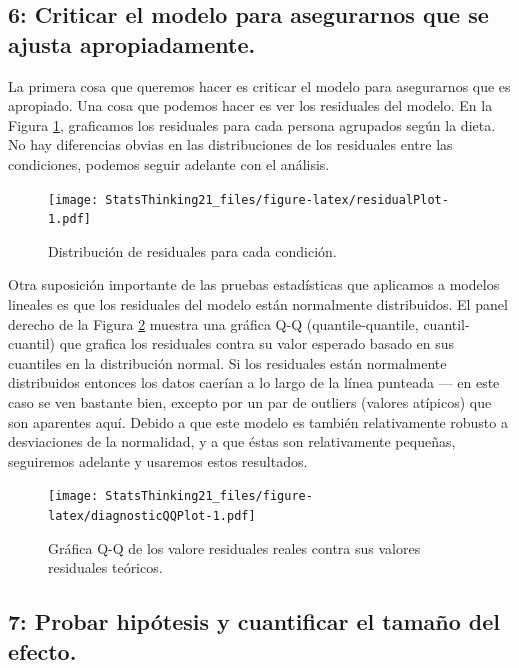 \documentclass[
  12pt,
]{book}
\theoremstyle{definition}
\theoremstyle{definition}
\theoremstyle{definition}
\theoremstyle{remark}
\begin{document}
\hypertarget{criticar-el-modelo-para-asegurarnos-que-se-ajusta-apropiadamente.}{%
\subsection{6: Criticar el modelo para asegurarnos que se ajusta apropiadamente.}\label{criticar-el-modelo-para-asegurarnos-que-se-ajusta-apropiadamente.}}

La primera cosa que queremos hacer es criticar el modelo para asegurarnos que es apropiado. Una cosa que podemos hacer es ver los residuales del modelo. En la Figura \ref{fig:residualPlot}, graficamos los residuales para cada persona agrupados según la dieta. No hay diferencias obvias en las distribuciones de los residuales entre las condiciones, podemos seguir adelante con el análisis.

\begin{figure}
\centering
\texttt{[image: StatsThinking21\_files/figure-latex/residualPlot-1.pdf]}
\caption{\label{fig:residualPlot}Distribución de residuales para cada condición.}
\end{figure}

Otra suposición importante de las pruebas estadísticas que aplicamos a modelos lineales es que los residuales del modelo están normalmente distribuidos. El panel derecho de la Figura \ref{fig:diagnosticQQPlot} muestra una gráfica Q-Q (quantile-quantile, cuantil-cuantil) que grafica los residuales contra su valor esperado basado en sus cuantiles en la distribución normal. Si los residuales están normalmente distribuidos entonces los datos caerían a lo largo de la línea punteada --- en este caso se ven bastante bien, excepto por un par de outliers (valores atípicos) que son aparentes aquí. Debido a que este modelo es también relativamente robusto a desviaciones de la normalidad, y a que éstas son relativamente pequeñas, seguiremos adelante y usaremos estos resultados.

\begin{figure}
\centering
\texttt{[image: StatsThinking21\_files/figure-latex/diagnosticQQPlot-1.pdf]}
\caption{\label{fig:diagnosticQQPlot}Gráfica Q-Q de los valore residuales reales contra sus valores residuales teóricos.}
\end{figure}

\hypertarget{probar-hipuxf3tesis-y-cuantificar-el-tamauxf1o-del-efecto.}{%
\subsection{7: Probar hipótesis y cuantificar el tamaño del efecto.}\label{probar-hipuxf3tesis-y-cuantificar-el-tamauxf1o-del-efecto.}}
\end{document}
